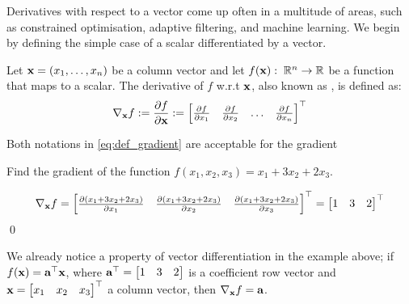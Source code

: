 \documentclass[a4paper]{article}
\begin{document}
Derivatives with respect to a vector come up often in a multitude of areas, such as constrained optimisation, adaptive filtering, and machine learning. We begin by defining the simple case of a scalar differentiated by a vector.
\begin{definition}[gradient]
Let $\textbf{x}= (x_1,\ldots,x_n)$ be a column vector and let $f(\textbf{x}): \; \mathbb{R}^n \rightarrow \mathbb{R}$ be a function that maps to a scalar. The derivative of $f$ w.r.t $\textbf{x}$, also known as , is defined as:
\begin{equation}
    \nabla_{\textbf{x}}f := \frac{\partial f}{\partial \textbf{x}} := 
    \begin{bmatrix}
    \frac{\partial f}{\partial x_1} & \frac{\partial f}{\partial x_2} & \ldots & \frac{\partial f}{\partial x_n}
    \end{bmatrix}^{\top}
    \label{eq:def_gradient}
\end{equation}
\end{definition}
Both notations in \eqref{eq:def_gradient} are acceptable for the gradient
\begin{exmp}
Find the gradient of the function $f(x_1, x_2, x_3) = x_1 + 3x_2 + 2x_3$.
\end{exmp}
\begin{soln}
\[
\nabla_{\textbf{x}}f = 
    \begin{bmatrix}
    \frac{\partial  (x_1 + 3x_2 + 2x_3)}{\partial x_1} & \frac{\partial  (x_1 + 3x_2 + 2x_3)}{\partial x_2} &  \frac{\partial ( x_1 + 3x_2 + 2x_3)}{\partial x_3} 
    \end{bmatrix}^{\top} = 
    \begin{bmatrix}
    1 & 3 & 2
    \end{bmatrix}^{\top}
\]
\qed
\end{soln}
We already notice a property of vector differentiation in the example above; if $f(\textbf{x}) = \textbf{a}^{\top}\textbf{x}$, where $\textbf{a}^{\top} = \begin{bmatrix} 1 & 3 & 2 \end{bmatrix}$ is a coefficient row vector and $\textbf{x} = \begin{bmatrix} x_1 & x_2 & x_3 \end{bmatrix}^{\top}$ a column vector, then $\nabla_{\textbf{x}}f = \textbf{a}$.
\end{document}
